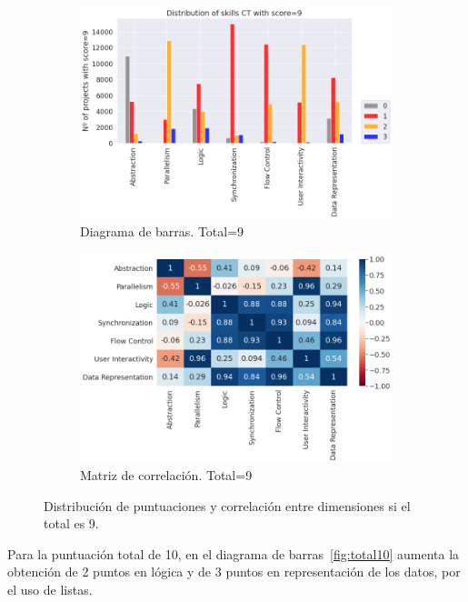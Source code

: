 \documentclass[a4paper, 12pt]{book}
\begin{document}
\begin{figure}[H]
    \centering
    \begin{subfigure}[h]{.49\textwidth} 
        \includegraphics[width=\textwidth]{img/distribucion_9_Scratch}
        \caption{Diagrama de barras. Total=9}
        \label{fig:total9}
    \end{subfigure}       
    \begin{subfigure}[h]{.49\textwidth} 
        \includegraphics[width=\textwidth]{img/corr_9_Scratch}
        \caption{Matriz de correlación. Total=9}
        \label{fig:corr9}
    \end{subfigure}
     \caption{Distribución de puntuaciones y correlación entre dimensiones si el total es 9.}
\end{figure}

Para la puntuación total de 10, en el diagrama de barras~\ref{fig:total10} aumenta la obtención de 2 puntos en lógica y de 3 puntos en representación de los datos, por el uso de listas. 
\end{document}
